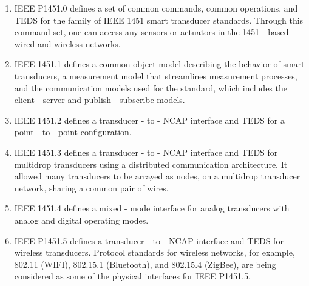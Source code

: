 \begin{enumerate}[label=\roman*]
  \item	IEEE P1451.0 defines a set of common commands, common operations, and TEDS for the family of IEEE 1451 smart transducer standards. Through this command set, one can access any sensors or actuators in the 1451 - based wired and wireless networks.
      \item	IEEE 1451.1 defines a common object model describing the behavior of smart transducers, a measurement model that streamlines measurement processes, and the communication models used for the standard, which includes the client - server and publish - subscribe models.
          \item	IEEE 1451.2 defines a transducer - to - NCAP interface and TEDS for a point - to - point configuration.
          \item	IEEE 1451.3 defines a transducer - to - NCAP interface and TEDS for multidrop transducers using a distributed communication architecture. It allowed many transducers to be arrayed as nodes, on a multidrop transducer network, sharing a common pair of wires.
\item	IEEE 1451.4 defines a mixed - mode interface for analog transducers with analog and digital operating modes.
\item	IEEE P1451.5 defines a transducer - to - NCAP interface and TEDS for wireless transducers. Protocol standards for wireless networks, for example, 802.11 (WIFI), 802.15.1 (Bluetooth), and 802.15.4 (ZigBee), are being considered as some of the physical interfaces for IEEE P1451.5.
\end{enumerate}
